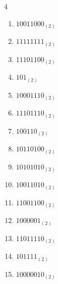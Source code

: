 \begin{multicols}{4}
\begin{enumerate}
        \phantom{$=143$}

  \item $10011000_{(2)}$

        \phantom{$=152$}

\columnbreak %

  \item $11111111_{(2)}$

        \phantom{$=255$}

  \item $11101100_{(2)}$

        \phantom{$=236$}

  \item $101_{(2)}$

        \phantom{$=5$}

  \item $10001110_{(2)}$

        \phantom{$=142$}

  \item $11101110_{(2)}$

        \phantom{$=238$}

  \item $100110_{(2)}$

        \phantom{$=38$}

  \item $10110100_{(2)}$

        \phantom{$=180$}

  \item $10101010_{(2)}$

        \phantom{$=170$}

  \item $10011010_{(2)}$

        \phantom{$=154$}

  \item $11001100_{(2)}$

        \phantom{$=204$}

  \item $1000001_{(2)}$

        \phantom{$=65$}

  \item $11011110_{(2)}$

        \phantom{$=222$}

  \item $101111_{(2)}$

        \phantom{$=47$}

  \item $10000010_{(2)}$


\end{enumerate}
\end{multicols}
